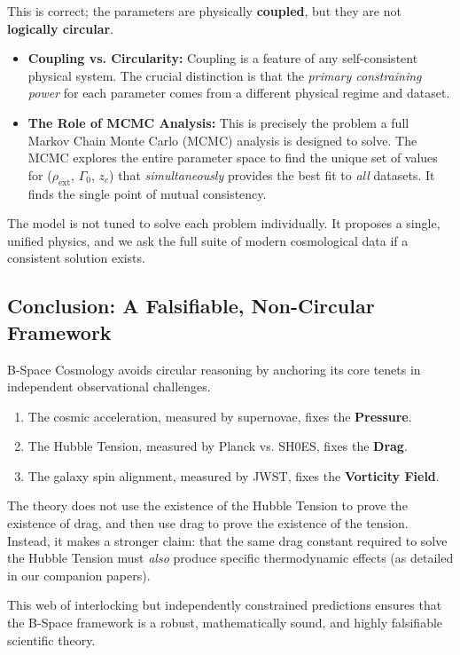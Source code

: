\documentclass{BSpacePaper} %
\begin{document}
\begin{appendices}
This is correct; the parameters are physically \textbf{coupled}, but they are not \textbf{logically circular}.
\begin{itemize}
    \item \textbf{Coupling vs. Circularity:} Coupling is a feature of any self-consistent physical system. The crucial distinction is that the \textit{primary constraining power} for each parameter comes from a different physical regime and dataset.
    \item \textbf{The Role of MCMC Analysis:} This is precisely the problem a full Markov Chain Monte Carlo (MCMC) analysis is designed to solve. The MCMC explores the entire parameter space to find the unique set of values for ($\rho_{\text{ext}}$, $\Gamma_0$, $z_c$) that \textit{simultaneously} provides the best fit to \textit{all} datasets. It finds the single point of mutual consistency.
\end{itemize}
The model is not tuned to solve each problem individually. It proposes a single, unified physics, and we ask the full suite of modern cosmological data if a consistent solution exists.

\subsection{Conclusion: A Falsifiable, Non-Circular Framework}
B-Space Cosmology avoids circular reasoning by anchoring its core tenets in independent observational challenges.
\begin{enumerate}
    \item The cosmic acceleration, measured by supernovae, fixes the \textbf{Pressure}.
    \item The Hubble Tension, measured by Planck vs. SH0ES, fixes the \textbf{Drag}.
    \item The galaxy spin alignment, measured by JWST, fixes the \textbf{Vorticity Field}.
\end{enumerate}
The theory does not use the existence of the Hubble Tension to prove the existence of drag, and then use drag to prove the existence of the tension. Instead, it makes a stronger claim: that the same drag constant required to solve the Hubble Tension must \textit{also} produce specific thermodynamic effects (as detailed in our companion papers).

This web of interlocking but independently constrained predictions ensures that the B-Space framework is a robust, mathematically sound, and highly falsifiable scientific theory.


\end{appendices}
\end{document}
